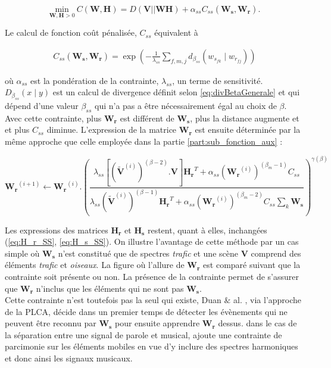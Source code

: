 \begin{equation}
\underset{\mathbf{W}, \mathbf{H} > 0}{\text{min}}~ C(\mathbf{W},\mathbf{H}) = D(\mathbf{V}\vert\vert \mathbf{WH}) + \alpha_{ss} C_{ss}(\mathbf{W_s},\mathbf{W_r}).
\end{equation}

Le calcul de fonction coût pénalisée, $C_{ss}$ équivalent à  

\begin{align}
C_{ss}(\mathbf{W_s},\mathbf{W_r}) = \exp\left(-\frac{1}{\lambda_{ss}}\sum_{f,m,j}d_{\beta_{ss}}(w_{s_{fk}} \mid w_{r_{fj}})\right)
\end{align}

où $\alpha_{ss}$ est la pondération de la contrainte, $\lambda_{ss}$, un terme de sensitivité. $D_{\beta_{ss}}(x \mid y)$ est un calcul de divergence définit selon \ref{eq:divBetaGenerale} et qui dépend d'une valeur $\beta_{ss}$ qui n'a pas a être nécessairement égal au choix de $\beta$. Avec cette contrainte, plus $\mathbf{W_r}$ est différent de $\mathbf{W_s}$, plus la distance augmente et et plus $C_{ss}$ diminue.  L'expression de la matrice $\mathbf{W_r}$ est ensuite déterminée par la même approche que celle employée dans la partie \ref{part:sub_fonction_aux} : 

\begin{equation}
\mathbf{W_r}^{(i+1)} \leftarrow \mathbf{W_r}^{(i)}.\left(\frac{\lambda_{ss}\left[\left(\mathbf{\tilde{V}}^{(i)} \right)^{(\beta-2)}.\mathbf{V} \right]\mathbf{H_r}^T+\alpha_{ss}\left(\mathbf{W_r}^{(i)}\right)^{(\beta_m-1)}C_{ss}}{\lambda_{ss}\left(\mathbf{\tilde{V}}^{(i)} \right)^{(\beta-1)}\mathbf{H_r}^T+\alpha_{ss}\left(\mathbf{W_r}^{(i)}\right)^{(\beta_m-2)}C_{ss}\sum_k \mathbf{W_s}} \right)^{\gamma(\beta)}
\end{equation}

Les expressions des matrices $\mathbf{H_r}$ et $\mathbf{H_s}$ restent, quant à elles, inchangées (\ref{eq:H_r_SS}, \ref{eq:H_s_SS}). On illustre l'avantage de cette méthode par un cas simple où $\mathbf{W_s}$ n'est constitué que de spectres \textit{trafic} et une scène $\mathbf{V}$ comprend des éléments \textit{trafic} et \textit{oiseaux}. La figure où l'allure de $\mathbf{W_r}$ est comparé suivant que la contrainte soit présente ou non. La présence de la contrainte permet de s'assurer que $\mathbf{W_r}$ n'inclus que les éléments qui ne sont pas $\mathbf{W_s}$.\\

Cette contrainte n'est toutefois pas la seul qui existe, Duan $\&$ al. \cite{duan_online_2012}, via l'approche de la PLCA, décide dans un premier temps de détecter les évènements qui ne peuvent être reconnu par $\mathbf{W_s}$ pour ensuite apprendre $\mathbf{W_r}$ dessus. \cite{} dans le cas de la séparation entre une signal de parole et musical, ajoute une contrainte de parcimonie sur les éléments mobiles en vue d'y inclure des spectres harmoniques et donc ainsi les signaux musicaux.
 




